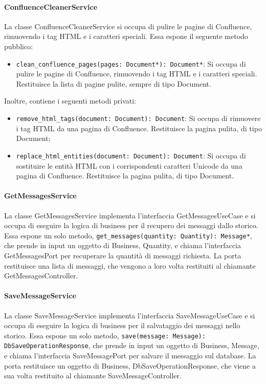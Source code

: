 \paragraph{ConfluenceCleanerService}
\label{sec:confluence_cleaner_service}
La classe ConfluenceCleanerService si occupa di pulire le pagine di Confluence, rimuovendo i tag HTML e i caratteri speciali. Essa espone il seguente metodo pubblico:
\begin{itemize}
    \item \texttt{clean\_confluence\_pages(pages: Document*): Document*}: Si occupa di pulire le pagine di Confluence, rimuovendo i tag HTML e i caratteri speciali. Restituisce la lista di pagine pulite, sempre di tipo Document.
\end{itemize}
Inoltre, contiene i seguenti metodi privati:
\begin{itemize}
    \item \texttt{remove\_html\_tags(document: Document): Document}: Si occupa di rimuovere i tag HTML da una pagina di Confluence. Restituisce la pagina pulita, di tipo Document;
    \item \texttt{replace\_html\_entities(document: Document): Document}: Si occupa di sostituire le entità HTML con i corrispondenti caratteri Unicode da una pagina di Confluence. Restituisce la pagina pulita, di tipo Document.
\end{itemize}

\paragraph{GetMessagesService}
\label{sec:get_messages_service}
La classe GetMessagesService implementa l'interfaccia GetMessagesUseCase e si occupa di eseguire la logica di business per il recupero dei messaggi dallo storico. Essa espone un solo metodo, \texttt{get\_messages(quantity: Quantity): Message*}, che prende in input un oggetto di Business, Quantity, e chiama l'interfaccia GetMessagesPort per recuperare la quantità di messaggi richiesta. La porta restituisce una lista di messaggi, che vengono a loro volta restituiti al chiamante GetMessagesController.

\paragraph{SaveMessageService}
\label{sec:save_message_service}
La classe SaveMessageService implementa l'interfaccia SaveMessageUseCase e si occupa di eseguire la logica di business per il salvataggio dei messaggi nello storico. Essa espone un solo metodo, \texttt{save(message: Message): DbSaveOperationResponse}, che prende in input un oggetto di Business, Message, e chiama l'interfaccia SaveMessagePort per salvare il messaggio sul database. La porta restituisce un oggetto di Business, DbSaveOperationResponse, che viene a sua volta restituito al chiamante SaveMessageController.

